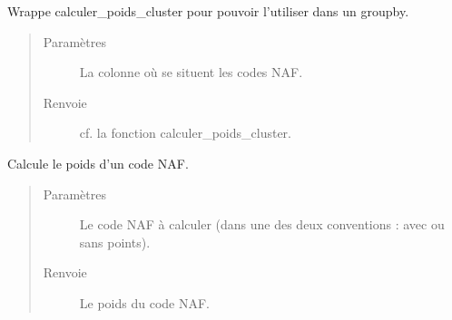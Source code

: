 \documentclass[letterpaper,10pt,french]{sphinxmanual}
\begin{document}
\begin{fulllineitems}
\label{\detokenize{index:src.clusterizer.utils.clusterizer_utils.calculer_poids_cluster_wrapper}}
\sphinxAtStartPar
Wrappe calculer\_poids\_cluster pour pouvoir l’utiliser dans un groupby.
\begin{quote}\begin{description}
\item[{Paramètres}] \leavevmode
\sphinxAtStartPar
{} \textendash{} La colonne où se situent les codes NAF.

\item[{Renvoie}] \leavevmode
\sphinxAtStartPar
cf. la fonction calculer\_poids\_cluster.

\end{description}\end{quote}

\end{fulllineitems}


\begin{fulllineitems}
\label{\detokenize{index:src.clusterizer.utils.clusterizer_utils.calculer_poids_code_NAF}}
\sphinxAtStartPar
Calcule le poids d’un code NAF.
\begin{quote}\begin{description}
\item[{Paramètres}] \leavevmode
\sphinxAtStartPar
{} \textendash{} Le code NAF à calculer (dans une des deux conventions : avec ou sans points).

\item[{Renvoie}] \leavevmode
\sphinxAtStartPar
Le poids du code NAF.

\end{description}\end{quote}

\end{fulllineitems}
\end{document}
